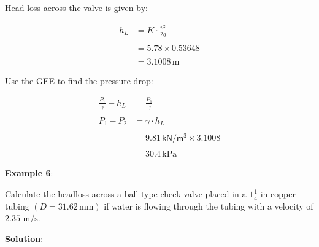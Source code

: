 \documentclass[10pt, oneside]{amsart}
\begin{document}
\begin{multicols}{2}
{	Head loss across the valve is given by:

	\begin{align*}
		h_L &= K\cdot\frac{v^2}{2g}\\\\
		&= 5.78\times 0.53648 \\\\
		&= 3.1008\,\text{m}
	\end{align*}

	Use the GEE to find the pressure drop:

	\begin{align*}
		\frac{P_1}{\gamma} - h_L &= \frac{P_1}{\gamma} \\\\
		P_1-P_2 &= \gamma\cdot h_L \\\\
		&= 9.81\,\mathsf{kN/m^3}\times 3.1008\\\\
		&= 30.4\,\text{kPa}
	\end{align*}

	}

	\vfill\pagebreak

	\textbf{Example 6}:

	Calculate the headloss across a ball-type check valve placed in a $1\tfrac{1}{4}\text{-in}$ copper
	tubing $(D=31.62\,\text{mm})$ if water is flowing through the tubing with a velocity of $2.35\text{ m/s}$.

	\textbf{Solution}:

\end{multicols}
\end{document}

